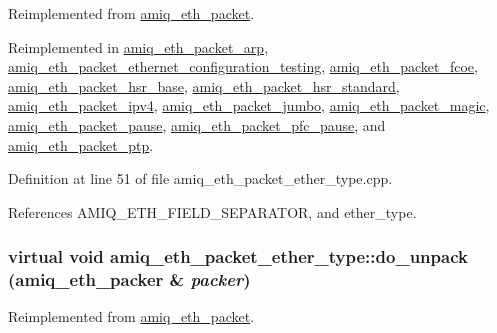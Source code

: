 Reimplemented from \hyperlink{classamiq__eth__packet_aa179c700ae183f1b884a9222a73fed4e}{amiq\_\-eth\_\-packet}.

Reimplemented in \hyperlink{classamiq__eth__packet__arp_abbb862d7b7abe9b1c6d49455f80f6921}{amiq\_\-eth\_\-packet\_\-arp}, \hyperlink{classamiq__eth__packet__ethernet__configuration__testing_aaac4abb2c0104900e30360871e01bbbd}{amiq\_\-eth\_\-packet\_\-ethernet\_\-configuration\_\-testing}, \hyperlink{classamiq__eth__packet__fcoe_a39fa215f83aa71ff06c5fd699de8e427}{amiq\_\-eth\_\-packet\_\-fcoe}, \hyperlink{classamiq__eth__packet__hsr__base_a83b7ccb4b601e00ba5cfbbfde6658632}{amiq\_\-eth\_\-packet\_\-hsr\_\-base}, \hyperlink{classamiq__eth__packet__hsr__standard_abaa39d881f90e05ae4acbb7fe5ebca0d}{amiq\_\-eth\_\-packet\_\-hsr\_\-standard}, \hyperlink{classamiq__eth__packet__ipv4_a5e93e2455918061cdc524f30626d4043}{amiq\_\-eth\_\-packet\_\-ipv4}, \hyperlink{classamiq__eth__packet__jumbo_a744d47397c29884a7da15e5582b331a2}{amiq\_\-eth\_\-packet\_\-jumbo}, \hyperlink{classamiq__eth__packet__magic_a57354d611adb80b1a8f4ad00c4f307a3}{amiq\_\-eth\_\-packet\_\-magic}, \hyperlink{classamiq__eth__packet__pause_a7ea960bd9c079375b0d4cd72a762d695}{amiq\_\-eth\_\-packet\_\-pause}, \hyperlink{classamiq__eth__packet__pfc__pause_a58c67ea445a72bc6c1c584625d642899}{amiq\_\-eth\_\-packet\_\-pfc\_\-pause}, and \hyperlink{classamiq__eth__packet__ptp_a52db9ab62ab743317a7ca4745a823a82}{amiq\_\-eth\_\-packet\_\-ptp}.

Definition at line 51 of file amiq\_\-eth\_\-packet\_\-ether\_\-type.cpp.

References AMIQ\_\-ETH\_\-FIELD\_\-SEPARATOR, and ether\_\-type.\hypertarget{classamiq__eth__packet__ether__type_a0c86ef80c46bbed384739b23e5efb0ef}{
\subsubsection[{do\_\-unpack}]{\setlength{\rightskip}{0pt plus 5cm}virtual void amiq\_\-eth\_\-packet\_\-ether\_\-type::do\_\-unpack ({\bf amiq\_\-eth\_\-packer} \& {\em packer})}}
\label{classamiq__eth__packet__ether__type_a0c86ef80c46bbed384739b23e5efb0ef}


Reimplemented from \hyperlink{classamiq__eth__packet_a909eb3860185125564fa530496ed1c9e}{amiq\_\-eth\_\-packet}.

